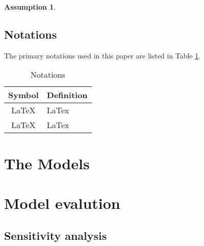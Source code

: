 \documentclass[12pt]{article}  %
\begin{document}


\newtheorem{assumption}{Assumption}[subsection]
\begin{assumption}

\end{assumption}

\subsection{Notations}
The primary notations used in this paper are listed in Table \ref{tb:notation}.

\begin{table}[H]
\begin{center}
\caption{Notations}
\begin{tabular}{cl}
	\toprule
	\multicolumn{1}{m{3cm}}{\textbf{Symbol}}
	&\multicolumn{1}{m{8cm}}{\textbf{Definition}}\\
	\midrule
	\multicolumn{1}{m{3cm}}{\LaTeX}&LaTex\\
   \multicolumn{1}{m{3cm}}{\LaTeX}&LaTex\\


	\bottomrule
\end{tabular}\label{tb:notation}
\end{center}
\end{table}










\section{The Models}










\section{Model evalution}
\subsection{Sensitivity analysis}
\end{document}
